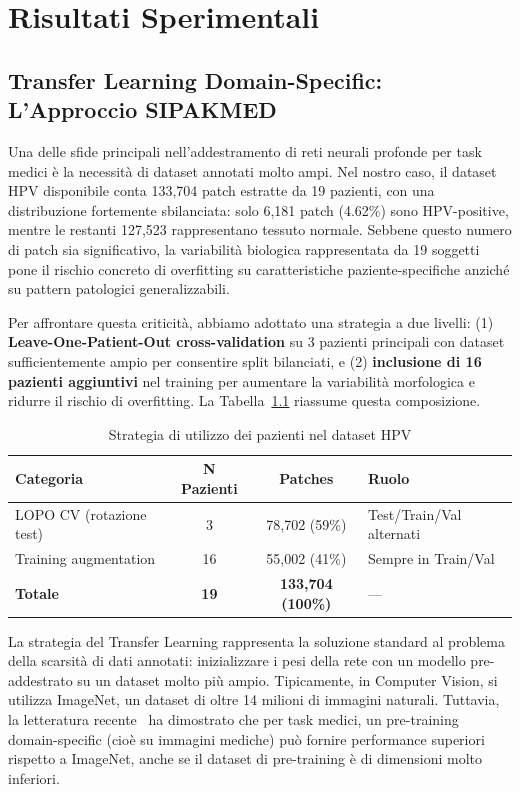 \chapter{Risultati Sperimentali}


	\section{Transfer Learning Domain-Specific: L'Approccio SIPAKMED}
	
	Una delle sfide principali nell'addestramento di reti neurali profonde per task medici è la necessità di dataset annotati molto ampi. Nel nostro caso, il dataset HPV disponibile conta 133,704 patch estratte da 19 pazienti, con una distribuzione fortemente sbilanciata: solo 6,181 patch (4.62\%) sono HPV-positive, mentre le restanti 127,523 rappresentano tessuto normale. Sebbene questo numero di patch sia significativo, la variabilità biologica rappresentata da 19 soggetti pone il rischio concreto di overfitting su caratteristiche paziente-specifiche anziché su pattern patologici generalizzabili.
	
	Per affrontare questa criticità, abbiamo adottato una strategia a due livelli: (1) \textbf{Leave-One-Patient-Out cross-validation} su 3 pazienti principali con dataset sufficientemente ampio per consentire split bilanciati, e (2) \textbf{inclusione di 16 pazienti aggiuntivi} nel training per aumentare la variabilità morfologica e ridurre il rischio di overfitting. La Tabella~\ref{tab:dataset_patient_strategy} riassume questa composizione.
	
	\begin{table}[h]
		\centering
		\small
		\caption{Strategia di utilizzo dei pazienti nel dataset HPV}
		\label{tab:dataset_patient_strategy}
		\begin{tabular}{lccl}
			\toprule
			\textbf{Categoria} & \textbf{N Pazienti} & \textbf{Patches} & \textbf{Ruolo} \\
			\midrule
			LOPO CV (rotazione test) & 3 & 78,702 (59\%) & Test/Train/Val alternati \\
			Training augmentation & 16 & 55,002 (41\%) & Sempre in Train/Val \\
			\midrule
			\textbf{Totale} & \textbf{19} & \textbf{133,704 (100\%)} & — \\
			\bottomrule
		\end{tabular}
	\end{table}
	
	La strategia del Transfer Learning rappresenta la soluzione standard al problema della scarsità di dati annotati: inizializzare i pesi della rete con un modello pre-addestrato su un dataset molto più ampio. Tipicamente, in Computer Vision, si utilizza ImageNet, un dataset di oltre 14 milioni di immagini naturali. Tuttavia, la letteratura recente~\cite{raghu2019transfusion} ha dimostrato che per task medici, un pre-training domain-specific (cioè su immagini mediche) può fornire performance superiori rispetto a ImageNet, anche se il dataset di pre-training è di dimensioni molto inferiori.
	
